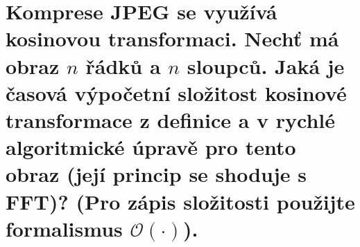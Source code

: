 \section{Komprese JPEG se využívá kosinovou transformaci. Nechť má obraz $n$ řádků a $n$ sloupců. Jaká je časová 
výpočetní složitost kosinové transformace z definice a v rychlé algoritmické úpravě pro tento obraz (její princip se 
shoduje s FFT)? (Pro zápis složitosti použijte formalismus $\mathcal{O}(\cdot)$).}